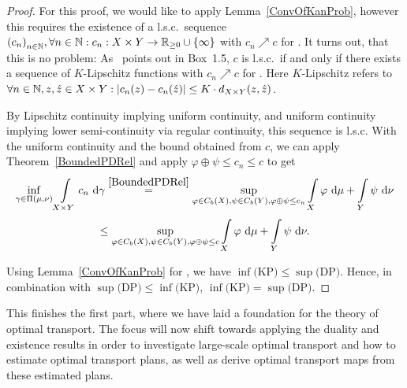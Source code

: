 \begin{proof}
	For this proof, we would like to apply Lemma~\ref{ConvOfKanProb}, however this requires the existence of a l.s.c.\ sequence ${(c_n)}_{\NinN}, \forall \NinN: \map[c_n]{X \times Y}{\RZero \cup \{ \infty \}}$ with $c_n \nearrow c$ for \Ninf. It turns out, that this is no problem: As~\cite{San2015} points out in Box~1.5, $c$ is l.s.c.\ if and only if there exists a sequence of $K$-Lipschitz functions with $c_n \nearrow c$ for \Ninf. Here $K$-Lipschitz refers to $\forall \NinN{}, z, \hat{z} \in X \times Y: \vert c_n(z) - c_n(\hat{z}) \vert \le K \cdot d_{X \times Y}(z, \hat{z})$.

	By Lipschitz continuity implying uniform continuity, and uniform continuity implying lower semi-continuity via regular continuity, this sequence is l.s.c. With the uniform continuity and the bound obtained from $c$, we can apply Theorem~\ref{BoundedPDRel} and apply $\varphi \oplus \psi \le c_n \le c$ to get
	\[ \inf\limits_{\gamma \in \TP{\mu}{\nu}} \int\limits_{X \times Y} c_n~\D[\gamma] \overset{\ref{BoundedPDRel}}{=} \sup\limits_{\varphi \in \CF[b]{X}, \psi \in \CF[b]{Y}, \varphi \oplus \psi \le c_n} \int\limits_X \varphi~\D + \int\limits_Y \psi~\D[\nu] \]
	\[ \le \sup\limits_{\varphi \in \CF[b]{X}, \psi \in \CF[b]{Y}, \varphi \oplus \psi \le c} \int\limits_X \varphi~\D + \int\limits_Y \psi~\D[\nu]. \]

	Using Lemma~\ref{ConvOfKanProb} for \Ninf, we have $\inf \text{(KP)} \le \sup \text{(DP)}$. Hence, in combination with $\sup \text{(DP)} \le \inf \text{(KP)}$, $\inf \text{(KP)} = \sup \text{(DP)}$.
\end{proof}

This finishes the first part, where we have laid a foundation for the theory of optimal transport. The focus will now shift towards applying the duality and existence results in order to investigate large-scale optimal transport and how to estimate optimal transport plans, as well as derive optimal transport maps from these estimated plans.